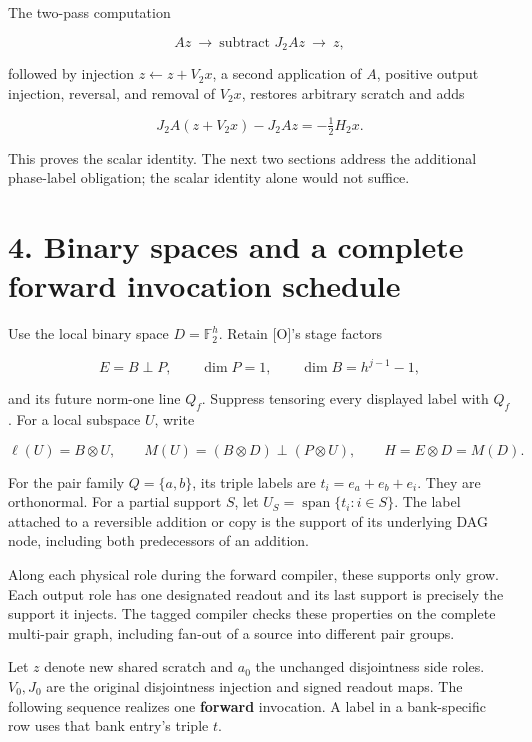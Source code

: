 \documentclass[
  11pt,
  letterpaper,
]{article}
\begin{document}
The two-pass computation

\[
Az\ \longrightarrow\ \text{subtract }J_2Az\ \longrightarrow\ z,
\]

followed by injection \(z\leftarrow z+V_2x\), a second application of
\(A\), positive output injection, reversal, and removal of \(V_2x\),
restores arbitrary scratch and adds

\[
J_2A(z+V_2x)-J_2Az=-\tfrac12H_2x.
\]

This proves the scalar identity. The next two sections address the
additional phase-label obligation; the scalar identity alone would not
suffice.

\section{4. Binary spaces and a complete forward invocation
schedule}\label{binary-spaces-and-a-complete-forward-invocation-schedule}

Use the local binary space \(D=\mathbb F_2^h\). Retain {[}O{]}'s stage
factors

\[
E=B\perp P,\qquad \dim P=1,\qquad\dim B=h^{j-1}-1,
\]

and its future norm-one line \(Q_f\). Suppress tensoring every displayed
label with \(Q_f\). For a local subspace \(U\), write

\[
\ell(U)=B\otimes U,\qquad
M(U)=(B\otimes D)\perp(P\otimes U),\qquad
H=E\otimes D=M(D).
\]

For the pair family \(Q=\{a,b\}\), its triple labels are
\(t_i=e_a+e_b+e_i\). They are orthonormal. For a partial support \(S\),
let \(U_S=\operatorname{span}\{t_i:i\in S\}\). The label attached to a
reversible addition or copy is the support of its underlying DAG node,
including both predecessors of an addition.

Along each physical role during the forward compiler, these supports
only grow. Each output role has one designated readout and its last
support is precisely the support it injects. The tagged compiler checks
these properties on the complete multi-pair graph, including fan-out of
a source into different pair groups.

Let \(z\) denote new shared scratch and \(a_0\) the unchanged
disjointness side roles. \(V_0,J_0\) are the original disjointness
injection and signed readout maps. The following sequence realizes one
\textbf{forward} invocation. A label in a bank-specific row uses that
bank entry's triple \(t\).
\end{document}
